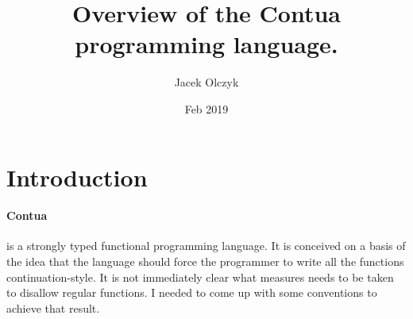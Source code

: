 \documentclass{article}
\title{Overview of the Contua programming language.}
\author{Jacek Olczyk}
\date{Feb 2019}
\begin{document}
	\maketitle
	\section{Introduction}
	\paragraph{Contua} is a strongly typed functional programming language. It is conceived on a basis of the idea that the language should force the programmer to write all the functions continuation-style. It is not immediately clear what measures needs to be taken to disallow regular functions. I needed to come up with some conventions to achieve that result.
\end{document}
